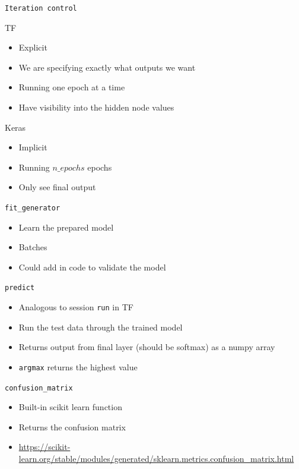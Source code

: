 \documentclass[aspectratio=169]{beamer}
\begin{document}
\begin{frame}[fragile]{\texttt{Iteration control}}


TF
\begin{itemize}
\item Explicit
\item We are specifying exactly what outputs we want
\item Running one epoch at a time
\item Have visibility into the hidden node values
\end{itemize}

Keras
\begin{itemize}
\item Implicit
\item Running $n\_epochs$ epochs
\item Only see final output
\end{itemize}

\end{frame}
\begin{frame}[fragile]{\texttt{fit\_generator}}

\begin{itemize}
\item Learn the prepared model
\item Batches
\item Could add in code to validate the model 
\end{itemize}
\end{frame}
\begin{frame}[fragile]{\texttt{predict}}

\begin{itemize}
\item Analogous to session \texttt{run} in TF
\item Run the test data through the trained model
\item Returns output from final layer (should be softmax) as a numpy array
\item \texttt{argmax} returns the highest value
\end{itemize}
\end{frame}
\begin{frame}[fragile]{\texttt{confusion\_matrix}}

\begin{itemize}
\item Built-in scikit learn function
\item Returns the confusion matrix
\item \url{https://scikit-learn.org/stable/modules/generated/sklearn.metrics.confusion\_matrix.html}
\end{itemize}
\end{frame}
\end{document}
